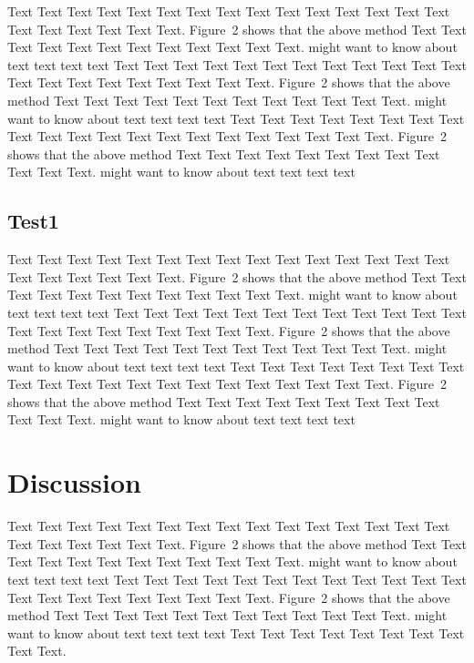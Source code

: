 \documentclass{bioinfo}
\begin{document}
Text Text Text Text Text Text  Text Text Text Text Text Text Text
Text Text  Text Text Text Text Text Text.
Figure~2\vphantom{\ref{fig:02}} shows that the above method  Text
Text Text Text  Text Text Text Text Text Text  Text Text.
\citealp{Boffelli03} might want to know about  text text text text
Text Text Text Text Text Text  Text Text Text Text Text Text Text
Text Text  Text Text Text Text Text Text.
Figure~2\vphantom{\ref{fig:02}} shows that the above method  Text
Text Text Text  Text Text Text Text Text Text  Text Text.
\citealp{Boffelli03} might want to know about  text text text text
Text Text Text Text Text Text Text Text Text Text Text Text Text
Text Text  Text Text Text Text Text Text.
Figure~2\vphantom{\ref{fig:02}} shows that the above method  Text
Text Text Text  Text Text Text Text Text Text  Text Text.
\citealp{Boffelli03} might want to know about  text text text text


\subsection{Test1}

Text Text Text Text Text Text  Text Text Text Text Text Text Text
Text Text  Text Text Text Text Text Text.
Figure~2\vphantom{\ref{fig:02}} shows that the above method  Text
Text Text Text  Text Text Text Text Text Text  Text Text.
\citealp{Boffelli03} might want to know about  text text text text
Text Text Text Text Text Text  Text Text Text Text Text Text Text
Text Text  Text Text Text Text Text Text.
Figure~2\vphantom{\ref{fig:02}} shows that the above method  Text
Text Text Text  Text Text Text Text Text Text  Text Text.
\citealp{Boffelli03} might want to know about  text text text text
Text Text Text Text Text Text Text Text Text Text Text Text Text
Text Text  Text Text Text Text Text Text.
Figure~2\vphantom{\ref{fig:02}} shows that the above method  Text
Text Text Text  Text Text Text Text Text Text  Text Text.
\citealp{Boffelli03} might want to know about  text text text text





\section{Discussion}

Text Text Text Text Text Text  Text Text Text Text Text Text Text
Text Text  Text Text Text Text Text Text.
Figure~2\vphantom{\ref{fig:02}} shows that the above method  Text
Text Text Text  Text Text Text Text Text Text  Text Text.
\citealp{Boffelli03} might want to know about  text text text text
Text Text Text Text Text Text  Text Text Text Text Text Text Text
Text Text  Text Text Text Text Text Text.
Figure~2\vphantom{\ref{fig:02}} shows that the above method  Text
Text Text Text  Text Text Text Text Text Text  Text Text.
\citealp{Boffelli03} might want to know about  text text text text
Text Text Text Text Text Text Text Text Text Text.
\end{document}
